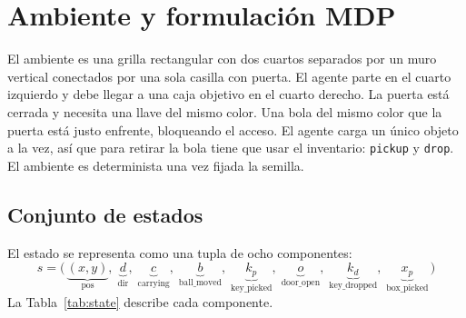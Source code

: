 \documentclass[11pt,a4paper]{article}
\begin{document}
\section{Ambiente y formulación MDP}
\label{sec:ambiente}

El ambiente es una grilla rectangular con dos cuartos separados por un
muro vertical conectados por una sola casilla con puerta. El agente
parte en el cuarto izquierdo y debe llegar a una caja objetivo en el
cuarto derecho. La puerta está cerrada y necesita una llave del mismo
color. Una bola del mismo color que la puerta está justo enfrente,
bloqueando el acceso. El agente carga un único objeto a la vez, así que
para retirar la bola tiene que usar el inventario: \texttt{pickup} y
\texttt{drop}. El ambiente es determinista una vez fijada la semilla.

\subsection{Conjunto de estados}

El estado se representa como una tupla de ocho componentes:
\begin{equation}
  s = \big(\,
    \underbrace{(x, y)}_{\text{pos}},\;
    \underbrace{d}_{\text{dir}},\;
    \underbrace{c}_{\text{carrying}},\;
    \underbrace{b}_{\text{ball\_moved}},\;
    \underbrace{k_p}_{\text{key\_picked}},\;
    \underbrace{o}_{\text{door\_open}},\;
    \underbrace{k_d}_{\text{key\_dropped}},\;
    \underbrace{x_p}_{\text{box\_picked}}
  \,\big)
  \label{eq:state}
\end{equation}
La Tabla~\ref{tab:state} describe cada componente.
\end{document}
